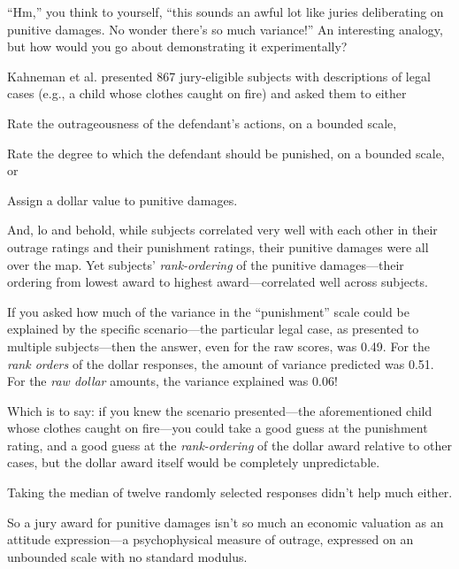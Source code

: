 {
 ``Hm,'' you think to yourself,
``this sounds an awful lot like juries deliberating on
punitive damages. No wonder there's so much
variance!'' An interesting analogy, but how would you
go about demonstrating it experimentally?}

{
 Kahneman et al. presented 867 jury-eligible subjects with
descriptions of legal cases (e.g., a child whose clothes caught on
fire) and asked them to either}

{
 Rate the outrageousness of the defendant's
actions, on a bounded scale,}

{
 Rate the degree to which the defendant should be punished, on a
bounded scale, or}

{
 Assign a dollar value to punitive damages.}

{
 And, lo and behold, while subjects correlated very well with each
other in their outrage ratings and their punishment ratings, their
punitive damages were all over the map. Yet subjects'
\textit{rank-ordering} of the punitive damages---their ordering from
lowest award to highest award---correlated well across subjects.}

{
 If you asked how much of the variance in the
``punishment'' scale could be
explained by the specific scenario---the particular legal case, as
presented to multiple subjects---then the answer, even for the raw
scores, was 0.49. For the \textit{rank orders} of the dollar responses,
the amount of variance predicted was 0.51. For the \textit{raw dollar}
amounts, the variance explained was 0.06!}

{
 Which is to say: if you knew the scenario presented---the
aforementioned child whose clothes caught on fire---you could take a
good guess at the punishment rating, and a good guess at the
\textit{rank-ordering} of the dollar award relative to other cases, but
the dollar award itself would be completely unpredictable.}

{
 Taking the median of twelve randomly selected responses
didn't help much either.}

{
 So a jury award for punitive damages isn't so much
an economic valuation as an attitude expression---a psychophysical
measure of outrage, expressed on an unbounded scale with no standard
modulus.}

